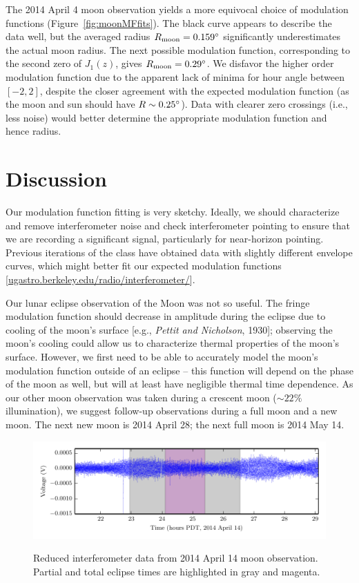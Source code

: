 \documentclass[10pt]{article}
\newcommand {\mt}{\mathrm}
\begin{document}
The 2014 April 4 moon observation yields a more equivocal choice of modulation functions (Figure~\ref{fig:moonMFfits}).  The black curve appears to describe the data well, but the averaged radius $R_{\mt{moon}} = 0.159\degree$ significantly underestimates the actual moon radius.  The next possible modulation function, corresponding to the second zero of $J_1(z)$, gives $R_{\mt{moon}} = 0.29\degree$.  We disfavor the higher order modulation function due to the apparent lack of minima for hour angle between $[-2, 2]$, despite the closer agreement with the expected modulation function (as the moon and sun should have $R \sim 0.25\degree$).  Data with clearer zero crossings (i.e., less noise) would better determine the appropriate modulation function and hence radius.

\section{Discussion}

Our modulation function fitting is very sketchy.  Ideally, we should characterize and remove interferometer noise and check interferometer pointing to ensure that we are recording a significant signal, particularly for near-horizon pointing.  Previous iterations of the class have obtained data with slightly different envelope curves, which might better fit our expected modulation functions [\href{http://ugastro.berkeley.edu/radio/interferometer/}
{ugastro.berkeley.edu/radio/interferometer/}].

Our lunar eclipse observation of the Moon was not so useful.  The fringe modulation function should decrease in amplitude during the eclipse due to cooling of the moon's surface [e.g., \textit{Pettit and Nicholson}, 1930]; observing the moon's cooling could allow us to characterize thermal properties of the moon's surface.  However, we first need to be able to accurately model the moon's modulation function outside of an eclipse -- this function will depend on the phase of the moon as well, but will at least have negligible thermal time dependence.  As our other moon observation was taken during a crescent moon ($\sim22\%$ illumination), we suggest follow-up observations during a full moon and a new moon.  The next new moon is 2014 April 28; the next full moon is 2014 May 14.

\begin{figure}[!ht]
    \centering
    \includegraphics{plots/moon_eclipse_nice_clean.pdf} \\
    \caption{Reduced interferometer data from 2014 April 14 moon observation.  Partial and total eclipse times are highlighted in gray and magenta.}
    \label{fig:eclipse}
\end{figure}
\end{document}
